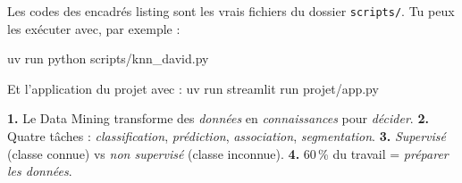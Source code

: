 \documentclass[11pt,a4paper]{report}
\begin{document}
\begin{Astuce}
Les codes des encadrés \og listing \fg{} sont les vrais fichiers du dossier
\texttt{scripts/}. Tu peux les exécuter avec, par exemple :
\begin{center}\ttfamily uv run python scripts/knn\_david.py\end{center}
Et l'application du projet avec : \ttfamily uv run streamlit run projet/app.py
\end{Astuce}

\begin{Resume}
\textbf{1.} Le Data Mining transforme des \emph{données} en \emph{connaissances} pour
\emph{décider}.\quad
\textbf{2.} Quatre tâches : \emph{classification}, \emph{prédiction}, \emph{association},
\emph{segmentation}.\quad
\textbf{3.} \emph{Supervisé} (classe connue) vs \emph{non supervisé} (classe inconnue).\quad
\textbf{4.} 60\,\% du travail = \emph{préparer les données}.
\end{Resume}







\end{document}
